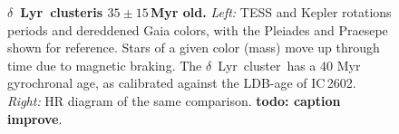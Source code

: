 \documentclass[12pt,modern,tighten]{aastex63}
\newcommand{\cn}{$\delta$~Lyr\ cluster} %
\begin{document}
\begin{figure}[t]
	\begin{center}
		\leavevmode
	\end{center}
	\vspace{-0.7cm}
	\caption{
    {\bf \cn is $35\pm15$\,Myr old.} {\it Left:} TESS and
    Kepler rotations periods and dereddened Gaia colors, with the
    Pleiades \citep[125\,Myr;][]{rebull_rotation_2016a} and Praesepe
    \citep[650\,Myr;][]{douglas_poking_2017} shown for reference.
    Stars of a given color (mass) move up through time due to magnetic
    braking.  The \cn\ has a 40 Myr gyrochronal age, as calibrated
    against the LDB-age of IC\,2602.  {\it Right:} HR diagram of the
    same comparison. {\bf todo: caption improve}.
   \label{fig:age}
	}
\end{figure}
\end{document}
